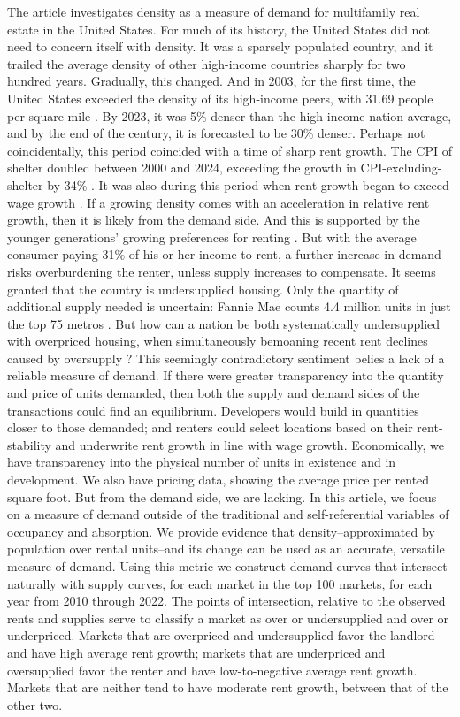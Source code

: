 \documentclass[sn-mathphys-num]{sn-jnl}%
\theoremstyle{thmstyleone}%
\theoremstyle{thmstyletwo}%
\theoremstyle{thmstylethree}%
\begin{document}
The article investigates density as a measure of demand for multifamily real estate in the United States. For much of its history, the United States did not need to concern itself with density. It was a sparsely populated country, and it trailed the average density of other high-income countries sharply for two hundred years. Gradually, this changed. And in 2003, for the first time, the United States exceeded the density of its high-income peers, with 31.69 people per square mile \cite{ourworldindataPopulationDensity}. By 2023, it was 5\% denser than the high-income nation average, and by the end of the century, it is forecasted to be 30\% denser. Perhaps not coincidentally, this period coincided with a time of sharp rent growth. The CPI of shelter doubled between 2000 and 2024, exceeding the growth in CPI-excluding-shelter by 34\% \cite{stlouisfedConsumerPrice}. It was also during this period when rent growth began to exceed wage growth \cite{feiveson2024rent}. If a growing density comes with an acceleration in relative rent growth, then it is likely from the demand side. And this is supported by the younger generations' growing preferences for renting \cite{fanniemaeConsumersFeeling}. But with the average consumer paying 31\% \cite{censusNearlyHalf} of his or her income to rent, a further increase in demand risks overburdening the renter, unless supply increases to compensate. It seems granted that the country is undersupplied housing. Only the quantity of additional supply needed is uncertain: Fannie Mae counts 4.4 million units in just the top 75 metros \cite{betancourt2022us}. But how can a nation be both systematically undersupplied  with overpriced housing, when simultaneously bemoaning recent rent declines caused by oversupply \cite{mott2024ThisRegion}? This seemingly contradictory sentiment belies a lack of a reliable measure of demand. If there were greater transparency into the quantity and price of units demanded, then both the supply and demand sides of the transactions could find an equilibrium. Developers would build in quantities closer to those demanded; and renters could select locations based on their rent-stability and underwrite rent growth in line with wage growth. Economically, we have transparency into the physical number of units in existence and in development. We also have pricing data, showing the average price per rented square foot. But from the demand side, we are lacking. In this article, we focus on a measure of demand outside of the traditional and self-referential variables of occupancy and absorption. We provide evidence that density--approximated by population over rental units--and its change can be used as an accurate, versatile measure of demand. Using this metric we construct demand curves that intersect naturally with supply curves, for each market in the top 100 markets, for each year from 2010 through 2022. The points of intersection, relative to the observed rents and supplies serve to classify a market as over or undersupplied and over or underpriced. Markets that are overpriced and undersupplied favor the landlord and have high average rent growth; markets that are underpriced and oversupplied favor the renter and have low-to-negative average rent growth. Markets that are neither tend to have moderate rent growth, between that of the other two. 
\end{document}
